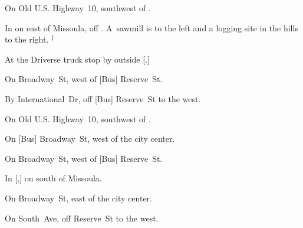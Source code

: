 

\begin{LocationList}

On  Old U.S. Highway~10, southwest of  .

In  on  east of Missoula, off  .
A~sawmill is to the left and a logging site in the hills to the right.%
\textsuperscript{\scriptsize $\dagger$}

At the Driverse truck stop by   outside [.]

\Location{\GarageHQ \Garage}
On Broadway~St, west of [Bus]  Reserve~St.

By International~Dr, off [Bus]  Reserve~St to the west.

On  Old U.S. Highway~10, southwest of  .

On [Bus] Broadway~St, west of the city center.

On Broadway~St, west of [Bus]  Reserve~St.

\Location{\TruckStop \Gas \Rest \Weigh}
In [,] on   south of Missoula.

On Broadway~St, east of the city center.

On South~Ave, off  Reserve~St to the west.

\end{LocationList}

